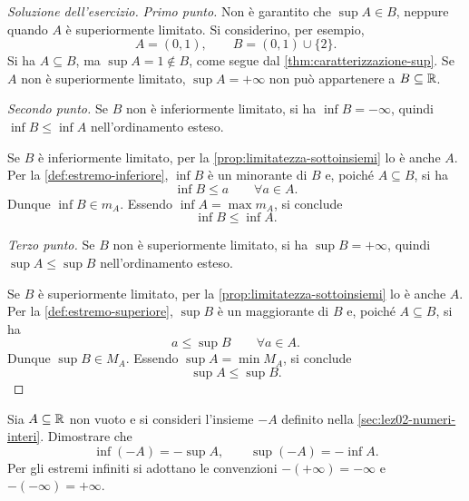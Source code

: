 \begin{proof}[Soluzione dell'esercizio]
\emph{Primo punto.}
Non è garantito che \(\sup A\in B\), neppure quando
\(A\) è superiormente limitato. Si considerino, per esempio,
\[
  A=(0,1),\qquad B=(0,1)\cup\{2\}.
\]
Si ha \(A\subseteq B\), ma \(\sup A=1\notin B\), come segue
dal \cref{thm:caratterizzazione-sup}.
Se \(A\) non è superiormente limitato, \(\sup A=+\infty\)
non può appartenere a \(B\subseteq\mathbb{R}\).

\clearpage

\emph{Secondo punto.}
Se \(B\) non è inferiormente limitato, si ha \(\inf B=-\infty\),
quindi \(\inf B\le\inf A\) nell'ordinamento esteso.

Se \(B\) è inferiormente limitato, per la
\cref{prop:limitatezza-sottoinsiemi} lo è anche \(A\).
Per la \cref{def:estremo-inferiore}, \(\inf B\) è un minorante
di \(B\) e, poiché \(A\subseteq B\), si ha
\[
  \inf B\le a\qquad\forall a\in A.
\]
Dunque \(\inf B\in m_A\). Essendo \(\inf A=\max m_A\),
si conclude
\[
  \inf B\le\inf A.
\]

\emph{Terzo punto.}
Se \(B\) non è superiormente limitato, si ha \(\sup B=+\infty\),
quindi \(\sup A\le\sup B\) nell'ordinamento esteso.

Se \(B\) è superiormente limitato, per la
\cref{prop:limitatezza-sottoinsiemi} lo è anche \(A\).
Per la \cref{def:estremo-superiore}, \(\sup B\) è un maggiorante
di \(B\) e, poiché \(A\subseteq B\), si ha
\[
  a\le\sup B\qquad\forall a\in A.
\]
Dunque \(\sup B\in M_A\). Essendo \(\sup A=\min M_A\),
si conclude
\[
  \sup A\le\sup B.
\]
\end{proof}

\begin{exercise}
\label{ex:estremi-insieme-opposto}
Sia \(A\subseteq\mathbb{R}\) non vuoto e si consideri l'insieme
\(-A\) definito nella \cref{sec:lez02-numeri-interi}.
Dimostrare che
\[
  \inf(-A)=-\sup A,
  \qquad
  \sup(-A)=-\inf A.
\]
Per gli estremi infiniti si adottano le convenzioni
\(-(+\infty)=-\infty\) e \(-(-\infty)=+\infty\).
\end{exercise}


